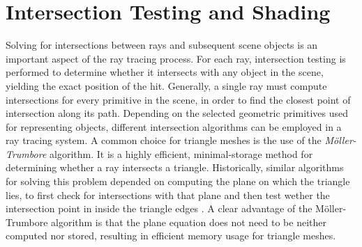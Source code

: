 \section{Intersection Testing and Shading}

Solving for intersections between rays and subsequent scene objects is an important aspect of the ray tracing process.
For each ray, intersection testing is performed to determine whether it intersects with any object in the scene, yielding the exact position of the hit.
Generally, a single ray must compute intersections for every primitive in the scene, in order to find the closest point of intersection along its path.
Depending on the selected geometric primitives used for representing objects, different intersection algorithms can be employed in a ray tracing system.
A common choice for triangle meshes is the use of the \textit{M{\"o}ller-Trumbore} \supercite{Moller2005} algorithm.
It is a highly efficient, minimal-storage method for determining whether a ray intersects a triangle.
Historically, similar algorithms for solving this problem depended on computing the plane on which the triangle lies, to first check for intersections with that plane and then test wether the intersection point in inside the triangle edges \supercite{Bogart1988}. 
A clear advantage of the M{\"o}ller-Trumbore algorithm is that the plane equation does not need to be neither computed nor stored, resulting in efficient memory usage for triangle meshes.

